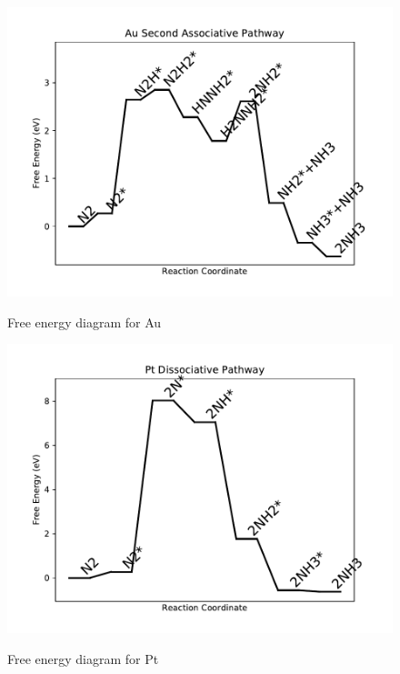\documentclass{article}
\begin{document}
\newpage
\begin{figure}
\includegraphics[width=1\linewidth]{data/plots/Au_associative_2.pdf}
\label{fig:Au_associative_2}
\caption{Free energy diagram for Au}
\end{figure}

\begin{figure}
\includegraphics[width=1\linewidth]{data/plots/Pt_dissociative.pdf}
\label{fig:Pt_dissociative}
\caption{Free energy diagram for Pt}
\end{figure}
\end{document}
